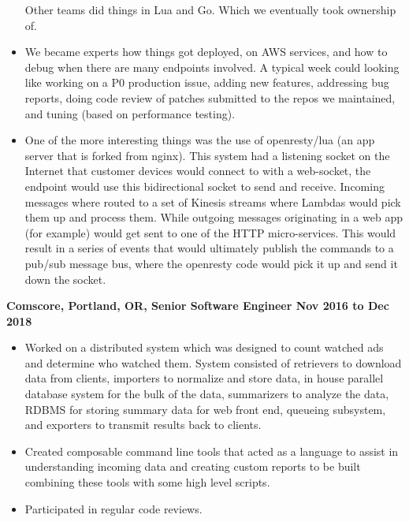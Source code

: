 \documentclass{res}
\begin{document}
\begin{resume}
\begin{itemize}
Other teams did things in Lua and Go. Which we eventually took ownership
of.

  \item
We became experts how things got deployed, on AWS services, and how to
debug when there are many endpoints involved.  A typical week could
looking like working on a P0 production issue, adding new features,
addressing bug reports, doing code review of patches submitted to the
repos we maintained, and tuning (based on performance testing).

  \item
One of the more interesting things was the use of openresty/lua (an app server
that is forked from nginx).  This system had a listening socket on the
Internet that customer devices would connect to with a web-socket, the endpoint
would use this bidirectional socket to send and receive.  Incoming messages
where routed to a set of Kinesis streams where Lambdas would pick them up and
process them.  While outgoing messages originating in a web app (for
example) would get sent to one of  the HTTP micro-services.  This would result
in a series of events that would ultimately publish the commands to a pub/sub
message bus, where the openresty code would pick it up and send it down the socket.
  \end{itemize}

  {\large \bf Comscore, Portland, OR, Senior Software Engineer \hfill Nov 2016 to Dec 2018}
  \begin{itemize}

  \item
    Worked on a distributed system which was designed to count watched ads and
    determine who watched them.  System consisted of retrievers to download
    data from clients, importers to normalize and store data, in house
    parallel database system for the bulk of the data, summarizers to
    analyze the data, RDBMS for storing summary data for
    web front end, queueing subsystem, and exporters to transmit
    results back to clients.

  \item
    Created composable command line tools that acted as a language to
    assist in understanding incoming data and creating custom reports to
    be built combining these tools with some high level scripts.

  \item
    Participated in regular code reviews.

  \end{itemize}


\end{resume}
\end{document}
